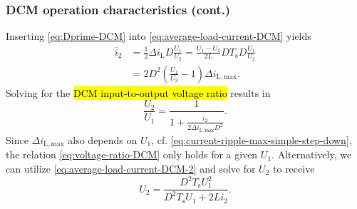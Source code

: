 \begin{frame}
    \frametitle{DCM operation characteristics (cont.)}
    Inserting \eqref{eq:Dprime-DCM} into \eqref{eq:average-load-current-DCM} yields
    \begin{equation}
        \begin{split}
            \overline{i}_2 &= \frac{1}{2}\Delta i_\mathrm{L}D\frac{U_1}{U_2} = \frac{U_1-U_2}{2L}DT_\mathrm{s}D\frac{U_1}{U_2}\\ &= 2D^2\left(\frac{U_1}{U_2}-1\right)\Delta i_\mathrm{L,max}.
        \end{split}
        \label{eq:average-load-current-DCM-2}
    \end{equation}
    Solving for the \hl{DCM input-to-output voltage ratio} results in
    \begin{equation}
        \frac{U_2}{U_1} = \frac{1}{1+\frac{\overline{i}_2}{2\Delta i_\mathrm{L,max}D^2}}.
        \label{eq:voltage-ratio-DCM}
    \end{equation}
    Since $\Delta i_\mathrm{L,max}$ also depends on $U_1$, cf.  \eqref{eq:current-ripple-max-simple-step-down}, the relation \eqref{eq:voltage-ratio-DCM} only holds for a given $U_1$. Alternatively, we can utilize \eqref{eq:average-load-current-DCM-2} and solve for $U_2$ to receive
    \begin{equation}
        U_2 = \frac{D^2T_\mathrm{s}U_1^2}{D^2T_\mathrm{s}U_1+2L\overline{i}_2}.
    \end{equation}
\end{frame}

